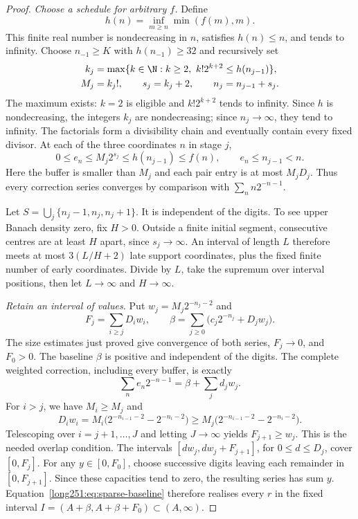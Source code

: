 \documentclass[11pt]{article}
\begin{document}
\begin{proof}
\emph{Choose a schedule for arbitrary $f$.}
Define
\[
 h(n)=\inf_{m\ge n}\min(f(m),m).
\]
This finite real number is nondecreasing in $n$, satisfies $h(n)\le n$,
and tends to infinity.  Choose $n_{-1}\ge K$ with $h(n_{-1})\ge32$ and
recursively set
\begin{equation}\label{long251:eq:sparse-general-schedule}
 \begin{split}
 k_j&=\max\{k\in\N:k\ge2,\ k!2^{k+2}\le h(n_{j-1})\},\\
 M_j&=k_j!,\qquad s_j=k_j+2,\qquad n_j=n_{j-1}+s_j.
 \end{split}
\end{equation}
The maximum exists: $k=2$ is eligible and $k!2^{k+2}$ tends to infinity.
Since $h$ is nondecreasing, the integers $k_j$ are nondecreasing; since
$n_j\to\infty$, they tend to infinity.  The factorials form a divisibility
chain and eventually contain every fixed divisor.  At each of the three
coordinates $n$ in stage $j$,
\[
 0\le e_n\le M_j2^{s_j}\le h(n_{j-1})\le f(n),
 \qquad e_n\le n_{j-1}<n.
\]
Here the buffer is smaller than $M_j$ and each pair entry is at most
$M_jD_j$.  Thus every correction series converges by comparison with
$\sum_n n2^{-n-1}$.

Let $S=\bigcup_j\{n_j-1,n_j,n_j+1\}$.  It is independent of the digits.
To see upper Banach density zero, fix $H>0$.  Outside a finite initial
segment, consecutive centres are at least $H$ apart, since $s_j\to\infty$.
An interval of length $L$ therefore meets at most
$3(L/H+2)$ late support coordinates, plus the fixed finite number of early
coordinates.  Divide by $L$, take the supremum over interval positions,
then let $L\to\infty$ and $H\to\infty$.

\emph{Retain an interval of values.}
Put $w_j=M_j2^{-n_j-2}$ and
\[
 F_j=\sum_{i\ge j}D_iw_i,\qquad
 \beta=\sum_{j\ge0}\bigl(c_j2^{-n_j}+D_jw_j\bigr).
\]
The size estimates just proved give convergence of both series, $F_j\to0$,
and $F_0>0$.  The baseline $\beta$ is positive and independent of the digits.
The complete weighted correction, including every buffer, is exactly
\begin{equation}\label{long251:eq:sparse-baseline}
 \sum_n e_n2^{-n-1}=\beta+\sum_jd_jw_j.
\end{equation}
For $i>j$, we have $M_i\ge M_j$ and
\[
 D_iw_i=M_i\bigl(2^{-n_{i-1}-2}-2^{-n_i-2}\bigr)
 \ge M_j\bigl(2^{-n_{i-1}-2}-2^{-n_i-2}\bigr).
\]
Telescoping over $i=j+1,\ldots,J$ and letting $J\to\infty$ yields
$F_{j+1}\ge w_j$.  This is the needed overlap condition.  The intervals
$[dw_j,dw_j+F_{j+1}]$, for $0\le d\le D_j$, cover $[0,F_j]$.
For any $y\in[0,F_0]$, choose successive digits leaving each remainder in
$[0,F_{j+1}]$.  Since these capacities tend to zero, the resulting series
has sum $y$.  Equation~\eqref{long251:eq:sparse-baseline} therefore realises
every $r$ in the fixed interval $I=(A+\beta,A+\beta+F_0)\subset(A,\infty)$.


\end{proof}
\end{document}
